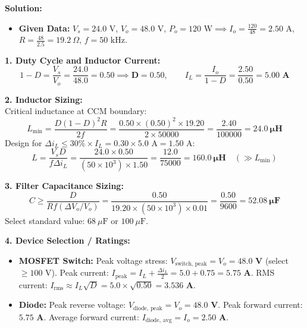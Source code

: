 \documentclass[10pt,a4paper]{article}
\begin{document}
\vspace{1mm}
\noindent\textbf{\textcolor{accentteal}{Solution:}}
\begin{itemize}
  \item \textbf{Given Data:} $V_s = 24.0\text{ V}$, $V_o = 48.0\text{ V}$, $P_o = 120\text{ W} \implies I_o = \frac{120}{48} = 2.50\text{ A}$, $R = \frac{48}{2.5} = 19.2\ \Omega$, $f = 50\text{ kHz}$.
\end{itemize}

\noindent\textbf{1. Duty Cycle and Inductor Current:}\\
\[
1 - D = \frac{V_s}{V_o} = \frac{24.0}{48.0} = 0.50 \implies \mathbf{D = 0.50}, \qquad I_L = \frac{I_o}{1 - D} = \frac{2.50}{0.50} = \mathbf{5.00\text{ A}}
\]

\noindent\textbf{2. Inductor Sizing:}\\
Critical inductance at CCM boundary:
\[
L_{\min} = \frac{D (1 - D)^2 R}{2 f} = \frac{0.50 \times (0.50)^2 \times 19.20}{2 \times 50000} = \frac{2.40}{100000} = \mathbf{24.0\ \mu\text{H}}
\]
Design for $\Delta i_L \le 30\% \times I_L = 0.30 \times 5.0\text{ A} = 1.50\text{ A}$:
\[
L = \frac{V_s D}{f \Delta i_L} = \frac{24.0 \times 0.50}{(50 \times 10^3) \times 1.50} = \frac{12.0}{75000} = \mathbf{160.0\ \mu\text{H}} \quad (\gg L_{\min})
\]

\noindent\textbf{3. Filter Capacitance Sizing:}\\
\[
C \ge \frac{D}{R f (\Delta V_o / V_o)} = \frac{0.50}{19.20 \times (50 \times 10^3) \times 0.01} = \frac{0.50}{9600} = \mathbf{52.08\ \mu\text{F}}
\]
Select standard value: \textbf{$68\ \mu\text{F}$} or \textbf{$100\ \mu\text{F}$}.

\noindent\textbf{4. Device Selection / Ratings:}\\
\begin{itemize}
  \item \textbf{MOSFET Switch:} Peak voltage stress: $V_{\text{switch, peak}} = V_o = \mathbf{48.0\text{ V}}$ (select $\ge 100\text{ V}$). Peak current: $I_{\text{peak}} = I_L + \frac{\Delta i_L}{2} = 5.0 + 0.75 = \mathbf{5.75\text{ A}}$. RMS current: $I_{\text{rms}} \approx I_L \sqrt{D} = 5.0 \times \sqrt{0.50} = \mathbf{3.536\text{ A}}$.
  \item \textbf{Diode:} Peak reverse voltage: $V_{\text{diode, peak}} = V_o = \mathbf{48.0\text{ V}}$. Peak forward current: $\mathbf{5.75\text{ A}}$. Average forward current: $I_{\text{diode, avg}} = I_o = \mathbf{2.50\text{ A}}$.
\end{itemize}
\end{document}
